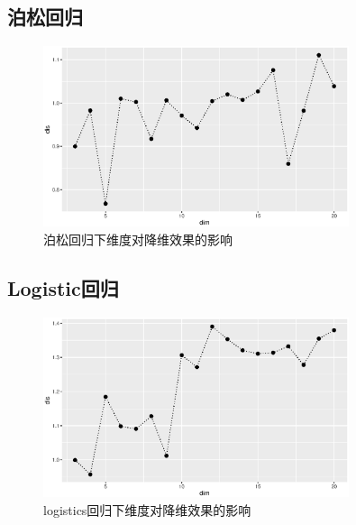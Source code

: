 \subsection{泊松回归}
\begin{figure}[H]
    \centering
    \includegraphics[width=0.8\textwidth]{image/pois_phd.eps}
    \caption{泊松回归下维度对降维效果的影响}
\end{figure}

\subsection{Logistic回归}

\begin{figure}[H]
    \centering
    \includegraphics[width=0.8\textwidth]{image/logit_phd.eps}
    \caption{logistics回归下维度对降维效果的影响}
\end{figure}

